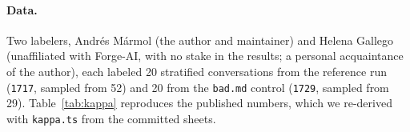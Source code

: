 \documentclass[11pt]{article}
\newcommand{\code}[1]{\texttt{#1}}
\begin{document}
\paragraph{Data.} Two labelers, Andr\'es M\'armol (the author and maintainer) and Helena Gallego
(unaffiliated with Forge-AI, with no stake in the results; a personal acquaintance of the author), each labeled 20 stratified
conversations from the reference run (\code{1717}, sampled from 52) and 20 from the \code{bad.md}
control (\code{1729}, sampled from 29).
Table~\ref{tab:kappa} reproduces the published numbers, which we re-derived with \code{kappa.ts} from the
committed sheets.
\end{document}
